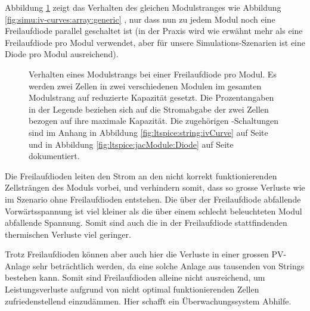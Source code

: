 \clearpage
Abbildung     \ref{fig:simu:iv-curves:array:generic:bypass}      zeigt     das
Verhalten       des      gleichen       Modulstranges      wie       Abbildung
\ref{fig:simu:iv-curves:array:generic} , nur dass nun zu jedem Modul noch eine
Freilaufdiode  parallel  geschaltet ist  (in  der  Praxis wird  wie  erw\"ahnt
mehr  als   eine  Freilaufdiode  pro   Modul  verwendet,  aber   f\"ur  unsere
Simulations-Szenarien ist eine Diode pro Modul ausreichend).

\begin{figure}[h!tb]
    \centering
    
    \caption[%
        IV- und PV-Kurven eines Modulsstrangs bei Leistungseinbruch,
        mit Freilaufdioden%
    ]
    {
        Verhalten   eines    Modulstrangs   bei   einer    Freilaufdiode   pro
        Modul. Es    werden     zwei    Zellen    in     zwei    verschiedenen
        Modulen   im   gesamten   Modulstrang   auf   reduzierte   Kapazit\"at
        gesetzt.   Die   Prozentangaben   in   der   Legende   beziehen   sich
        auf   die    Stromabgabe   der   zwei   Zellen    bezogen   auf   ihre
        maximale  Kapazit\"at. Die   zugeh\"origen  -Schaltungen
        sind   im   Anhang   in   Abbildung   \ref{fig:ltspice:string:ivCurve}
        auf     Seite      \pageref{fig:ltspice:string:ivCurve}     und     in
        Abbildung       \ref{fig:ltspice:jacModule:Diode}      auf       Seite
        \pageref{fig:ltspice:jacModule:Diode} dokumentiert.%
    }
    \label{fig:simu:iv-curves:array:generic:bypass}
\end{figure}

Die  Freilaufdioden leiten  den Strom  an den  nicht korrekt  funktionierenden
Zellstr\"angen  des  Moduls  vorbei,  und verhindern  somit,  dass  so  grosse
Verluste  wie  im  Szenario  ohne  Freilaufdioden  entstehen. Die  \"uber  der
Freilaufdiode abfallende  Vorw\"artsspannung ist  viel kleiner als  die \"uber
einem schlecht beleuchteten Modul abfallende Spannung.  Somit sind auch die in
der Freilaufdiode stattfindenden thermischen Verluste viel geringer.

Trotz  Freilaufdioden   k\"onnen  aber  auch   hier  die  Verluste   in  einer
grossen  PV-Anlage  sehr betr\"achtlich  werden,  da  eine solche  Anlage  aus
tausenden von  Strings bestehen kann. Somit sind  Freilaufdioden alleine nicht
ausreichend, um Leistungsverluste aufgrund  von nicht optimal funktionierenden
Zellen zufriedenstellend einzud\"ammen. Hier  schafft ein \"Uberwachungssystem
Abhilfe.


